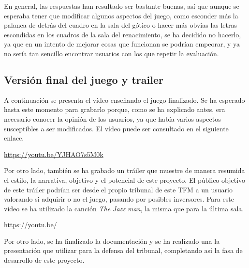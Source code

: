 En general, las respuestas han resultado ser bastante buenas, así que aunque se esperaba tener que modificar algunos aspectos del juego, como esconder más la palanca de detrás del cuadro en la sala del gótico o hacer más obvias las letras escondidas en los cuadros de la sala del renacimiento, se ha decidido no hacerlo, ya que en un intento de mejorar cosas que funcionan se podrían empeorar, y ya no sería tan sencillo encontrar usuarios con los que repetir la evaluación.

\subsection{Versión final del juego y trailer}

A continuación se presenta el vídeo enseñando el juego finalizado. Se ha esperado hasta este momento para grabarlo porque, como se ha explicado antes, era necesario conocer la opinión de los usuarios, ya que había varios aspectos susceptibles a ser modificados. El vídeo puede ser consultado en el siguiente enlace.

\begin{center}
    \url{https://youtu.be/YJHAO7s5M0k}
\end{center}

Por otro lado, también se ha grabado un tráiler que muestre de manera resumida el estilo, la narrativa, objetivo y el potencial de este proyecto. El público objetivo de este tráiler podrían ser desde el propio tribunal de este \acs{TFM} a un usuario valorando si adquirir o no el juego, pasando por posibles inversores. Para este vídeo se ha utilizado la canción \textit{The Jazz man}, la misma que para la última sala.

\begin{center}
    \url{https://youtu.be/}
\end{center}

\bigskip

Por otro lado, se ha finalizado la documentación y se ha realizado una la presentación que utilizar para la defensa del tribunal, completando así la fasa de desarrollo de este proyecto.